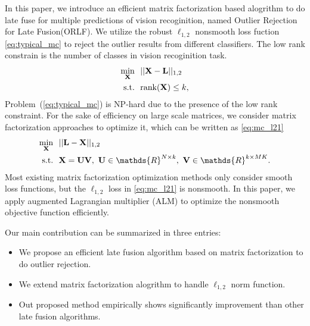 \documentclass[letterpaper]{article}
\def\bL{{\bf L}}
\def\bU{{\bf U}}
\def\bV{{\bf V}}
\def\dsR{\mathds{R}}
\def\bX{{\bf X}}
\def\bX{{\bf X}}
\def\st{{\text{s.t.}}}
\def\rank{{\text{rank}}}
\begin{document}
In this paper, we introduce an efficient matrix factorization based alogrithm to do late fuse for multiple predictions of vision recoginition, named Outlier Rejection for Late Fusion(ORLF).
We utilize the robust $\ell_{1,2}$ nonsmooth loss fuction \ref{eq:typical_mc} to reject the outlier results from different classifiers. The low rank constrain is the number of classes in vision recoginition task. 
\begin{align}\label{eq:typical_mc}
  \min_{\bX} ~&~ || \bX - \bL ||_{1,2}   \nonumber \\
  \st        ~&~ \rank(\bX) \leq k  ,
\end{align}
\noindent
Problem~(\ref{eq:typical_mc}) is NP-hard due to the presence of the low rank constraint. For the sake of efficiency on large scale matrices, we consider matrix factorization approaches to optimize it, which can be written as \ref{eq:mc_l21}
\begin{align}\label{eq:mf_l21}
  \min_{\bX} ~&~ || \bL - \bX ||_{1,2}    \nonumber \\
  \st        ~&~ \bX = \bU \bV,~\bU \in \dsR^{N \times k},~\bV \in \dsR^{k \times MK} .
\end{align}
\noindent
Most existing matrix factorization optimization methods only consider smooth loss functions, but the $\ell_{1,2}$ loss in \ref{eq:mc_l21} is nonsmooth. In this paper, we apply augmented Lagrangian multiplier (ALM) to optimize the nonsmooth objective function efficiently.

Our main contribution can be summarized in three entries:
\begin{itemize}
  \item We propose an efficient late fusion algorithm based on matrix factorization to do outlier rejection.
  \item We extend matrix factorization alogrithm to handle $\ell_{1,2}$ norm function.
  \item Out proposed method empirically shows significantly improvement than other late fusion algorithms.
\end{itemize}
\end{document}
